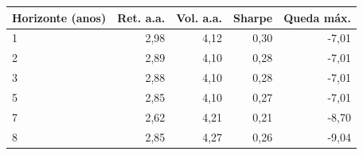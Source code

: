 \begin{tabular}{lrrrr}
\toprule
Horizonte (anos) & Ret. a.a. & Vol. a.a. & Sharpe & Queda máx. \\
\midrule
1 & 2,98 & 4,12 & 0,30 & -7,01 \\
2 & 2,89 & 4,10 & 0,28 & -7,01 \\
3 & 2,88 & 4,10 & 0,28 & -7,01 \\
5 & 2,85 & 4,10 & 0,27 & -7,01 \\
7 & 2,62 & 4,21 & 0,21 & -8,70 \\
8 & 2,85 & 4,27 & 0,26 & -9,04 \\
\bottomrule
\end{tabular}